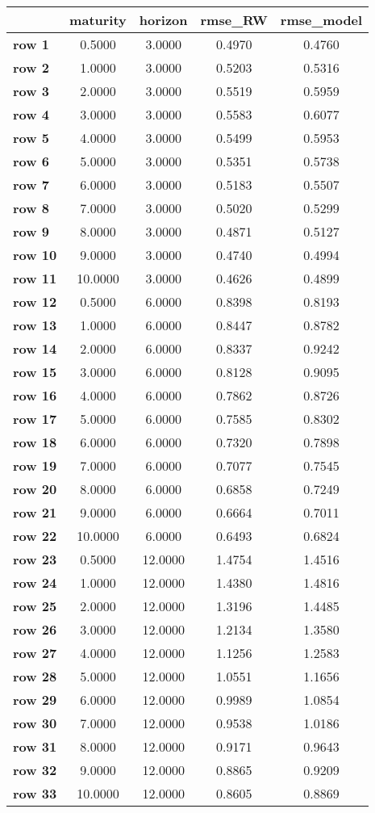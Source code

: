 \begin{tiny}\begin{tabular}{|l|c|c|c|c|}
\hline
&\textbf{maturity}&\textbf{horizon}&\textbf{rmse_RW}&\textbf{rmse_model}\\\hline
\textbf{row 1}&0.5000&3.0000&0.4970&0.4760\\\hline
\textbf{row 2}&1.0000&3.0000&0.5203&0.5316\\\hline
\textbf{row 3}&2.0000&3.0000&0.5519&0.5959\\\hline
\textbf{row 4}&3.0000&3.0000&0.5583&0.6077\\\hline
\textbf{row 5}&4.0000&3.0000&0.5499&0.5953\\\hline
\textbf{row 6}&5.0000&3.0000&0.5351&0.5738\\\hline
\textbf{row 7}&6.0000&3.0000&0.5183&0.5507\\\hline
\textbf{row 8}&7.0000&3.0000&0.5020&0.5299\\\hline
\textbf{row 9}&8.0000&3.0000&0.4871&0.5127\\\hline
\textbf{row 10}&9.0000&3.0000&0.4740&0.4994\\\hline
\textbf{row 11}&10.0000&3.0000&0.4626&0.4899\\\hline
\textbf{row 12}&0.5000&6.0000&0.8398&0.8193\\\hline
\textbf{row 13}&1.0000&6.0000&0.8447&0.8782\\\hline
\textbf{row 14}&2.0000&6.0000&0.8337&0.9242\\\hline
\textbf{row 15}&3.0000&6.0000&0.8128&0.9095\\\hline
\textbf{row 16}&4.0000&6.0000&0.7862&0.8726\\\hline
\textbf{row 17}&5.0000&6.0000&0.7585&0.8302\\\hline
\textbf{row 18}&6.0000&6.0000&0.7320&0.7898\\\hline
\textbf{row 19}&7.0000&6.0000&0.7077&0.7545\\\hline
\textbf{row 20}&8.0000&6.0000&0.6858&0.7249\\\hline
\textbf{row 21}&9.0000&6.0000&0.6664&0.7011\\\hline
\textbf{row 22}&10.0000&6.0000&0.6493&0.6824\\\hline
\textbf{row 23}&0.5000&12.0000&1.4754&1.4516\\\hline
\textbf{row 24}&1.0000&12.0000&1.4380&1.4816\\\hline
\textbf{row 25}&2.0000&12.0000&1.3196&1.4485\\\hline
\textbf{row 26}&3.0000&12.0000&1.2134&1.3580\\\hline
\textbf{row 27}&4.0000&12.0000&1.1256&1.2583\\\hline
\textbf{row 28}&5.0000&12.0000&1.0551&1.1656\\\hline
\textbf{row 29}&6.0000&12.0000&0.9989&1.0854\\\hline
\textbf{row 30}&7.0000&12.0000&0.9538&1.0186\\\hline
\textbf{row 31}&8.0000&12.0000&0.9171&0.9643\\\hline
\textbf{row 32}&9.0000&12.0000&0.8865&0.9209\\\hline
\textbf{row 33}&10.0000&12.0000&0.8605&0.8869\\\hline
\end{tabular}
\end{tiny}